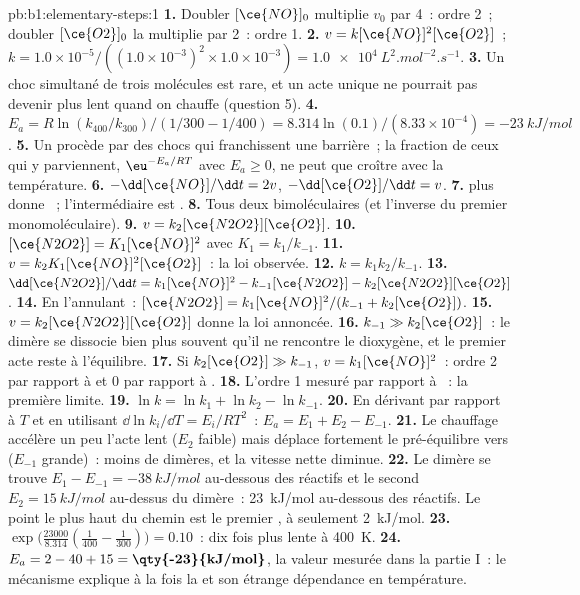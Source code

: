 \begin{solution}{pb:b1:elementary-steps:1}
\textbf{1.} Doubler $[\ce{NO}]_0$ multiplie $v_0$ par 4~: ordre 2~;
doubler $[\ce{O2}]_0$ la multiplie par 2~: ordre 1.
\textbf{2.} $v = k[\ce{NO}]^2[\ce{O2}]$~; $k = 1.0 \times 10^{-5}/((1.0
\times 10^{-3})^2 \times 1.0 \times 10^{-3}) =
\qty{1.0e4}{L^2.mol^{-2}.s^{-1}}$.
\textbf{3.} Un choc simultané de trois molécules est rare, et un acte
unique ne pourrait pas devenir plus lent quand on chauffe (question 5).
\textbf{4.} $E_a = R\ln(k_{400}/k_{300})/(1/300 - 1/400) = 8.314 \ln(0.1)
/(8.33 \times 10^{-4}) = \qty{-23}{kJ/mol}$.
\textbf{5.} Un  procède par des chocs qui franchissent
une barrière~; la fraction de ceux qui y parviennent, $\eu^{-E_a/RT}$
avec $E_a \ge
0$, ne peut que croître avec la température.
\textbf{6.} $-\dd[\ce{NO}]/\dd t = 2v$, $-\dd[\ce{O2}]/\dd t = v$.
\textbf{7.}  plus  donne
~; l'intermédiaire est .
\textbf{8.} Tous deux bimoléculaires (et l'inverse du premier
monomoléculaire).
\textbf{9.} $v = k_2[\ce{N2O2}][\ce{O2}]$.
\textbf{10.} $[\ce{N2O2}] = K_1[\ce{NO}]^2$ avec $K_1 = k_1/k_{-1}$.
\textbf{11.} $v = k_2K_1[\ce{NO}]^2[\ce{O2}]$~: la loi observée.
\textbf{12.} $k = k_1k_2/k_{-1}$.
\textbf{13.} $\dd[\ce{N2O2}]/\dd t = k_1[\ce{NO}]^2 - k_{-1}[\ce{N2O2}] -
k_2[\ce{N2O2}][\ce{O2}]$.
\textbf{14.} En l'annulant~: $[\ce{N2O2}] = k_1[\ce{NO}]^2/(k_{-1} +
k_2[\ce{O2}])$.
\textbf{15.} $v = k_2[\ce{N2O2}][\ce{O2}]$ donne la loi annoncée.
\textbf{16.} $k_{-1} \gg k_2[\ce{O2}]$~: le dimère se dissocie bien plus
souvent qu'il ne rencontre le dioxygène, et le premier acte reste à
l'équilibre.
\textbf{17.} Si $k_2[\ce{O2}] \gg k_{-1}$, $v = k_1[\ce{NO}]^2$~: ordre 2
par rapport à  et 0 par rapport à .
\textbf{18.} L'ordre 1 mesuré par rapport à ~: la première
limite.
\textbf{19.} $\ln k = \ln k_1 + \ln k_2 - \ln k_{-1}$.
\textbf{20.} En dérivant par rapport à $T$ et en utilisant
$\dd\ln k_i/\dd T
= E_i/RT^2$~: $E_a = E_1 + E_2 - E_{-1}$.
\textbf{21.} Le chauffage accélère un peu l'acte lent ($E_2$ faible) mais
déplace fortement le pré-équilibre vers  ($E_{-1}$ grande)~: moins
de dimères, et la vitesse nette diminue.
\textbf{22.} Le dimère se trouve $E_1 - E_{-1} = \qty{-38}{kJ/mol}$
au-dessous des réactifs et le second 
$E_2 = \qty{15}{kJ/mol}$ au-dessus du dimère~: \qty{23}{kJ/mol}
au-dessous des réactifs. Le point le plus haut du chemin est le premier
, à seulement \qty{2}{kJ/mol}.
\textbf{23.} $\exp\big(\frac{23000}{8.314}(\frac{1}{400} - \frac{1}{300})\big)
= 0.10$~: dix fois plus lente à \qty{400}{K}.
\textbf{24.} $E_a = 2 - 40 + 15 = \textbf{\qty{-23}{kJ/mol}}$, la valeur
mesurée dans la partie I~: le mécanisme explique à la fois la  et son étrange dépendance en température.
\end{solution}
